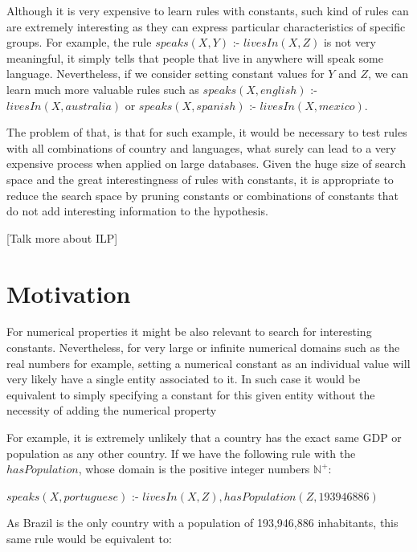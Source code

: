 Although it is very expensive to learn rules with constants, such kind of rules can are extremely interesting as they
can express particular characteristics of specific groups. For example, the rule $speaks(X,Y)$ :- $livesIn(X,Z)$ is not
very meaningful, it simply tells that people that live in anywhere will speak some language. Nevertheless, if we
consider setting constant values for $Y$ and $Z$, we can learn much more valuable rules such as
$speaks(X,english)$ :- $livesIn(X,australia)$ or $speaks(X,spanish)$ :- $livesIn(X,mexico)$.

The problem of that, is that for such example, it would be necessary to test rules with all combinations of country and
languages, what surely can lead to a very expensive process when applied on large databases. Given the huge size of
search space and the great interestingness of rules with constants, it is appropriate to reduce the search space by
pruning constants or combinations of constants that do not add interesting information to the
hypothesis.

[Talk more about ILP]


\section{Motivation}

For numerical properties it might be also relevant to search for interesting constants. Nevertheless, for very large or
infinite numerical domains such as the real numbers for example, setting a numerical constant as an individual value
will very likely have a single entity associated to it. In such case it would be equivalent to simply specifying a
constant for this given entity without the necessity of adding the numerical property

For example, it is extremely unlikely that a country has the exact same GDP or population as any other country. If we
have the following rule with the $hasPopulation$, whose domain is the positive integer numbers $\mathbb{N}^+$:

\begin{center}
 $speaks(X,portuguese)$ :- $livesIn(X,Z),hasPopulation(Z,193946886)$
\end{center}

As Brazil is the only country with a population of 193,946,886 inhabitants, this same rule would be equivalent to:

